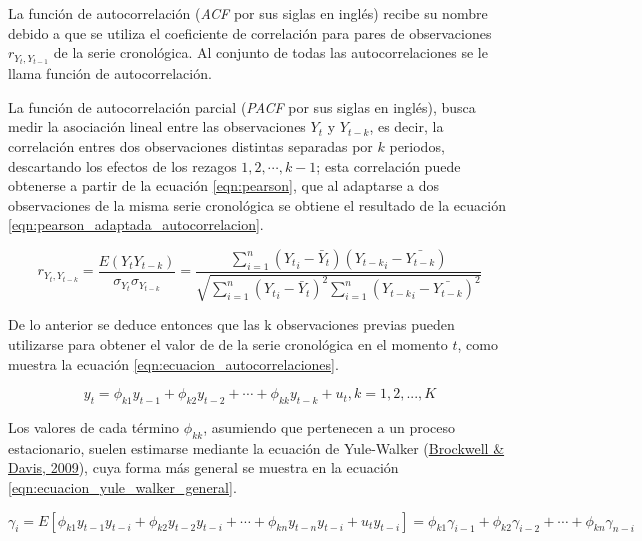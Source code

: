 \documentclass[
]{article}
\begin{document}
La función de autocorrelación (\emph{ACF} por sus siglas en inglés)
recibe su nombre debido a que se utiliza el coeficiente de correlación
para pares de observaciones \(r_{Y_t, Y_{t-1}}\) de la serie
cronológica. Al conjunto de todas las autocorrelaciones se le llama
función de autocorrelación.

La función de autocorrelación parcial (\emph{PACF} por sus siglas en
inglés), busca medir la asociación lineal entre las observaciones
\(Y_t\) y \(Y_{t-k}\), es decir, la correlación entres dos observaciones
distintas separadas por \(k\) periodos, descartando los efectos de los
rezagos \(1,2, \cdots ,k-1\); esta correlación puede obtenerse a partir
de la ecuación \ref{eqn:pearson}, que al adaptarse a dos observaciones
de la misma serie cronológica se obtiene el resultado de la ecuación
\ref{eqn:pearson_adaptada_autocorrelacion}.

\begin{equation}
\label{eqn:pearson_adaptada_autocorrelacion}
r_{{Y_t},{Y_{t-k}}}=\frac{E({Y_t}{Y_{t-k}})}{\sigma_{Y_t} \sigma_{Y_{t-k}}} = \frac{\sum_{i=1}^n \left({Y_t}_i- \bar{Y}_t \right) \left({Y_{t-k}}_i- \bar {Y_{t-k}}\right)}{\sqrt{\sum_{i=1}^n \left({Y_t}_i- \bar{Y}_t \right)^2 \sum_{i=1}^n \left({Y_{t-k}}_i- \bar {Y_{t-k}}\right)^2}}
\end{equation}

De lo anterior se deduce entonces que las k observaciones previas pueden
utilizarse para obtener el valor de de la serie cronológica en el
momento \(t\), como muestra la ecuación
\ref{eqn:ecuacion_autocorrelaciones}.

\begin{equation}
\label{eqn:ecuacion_autocorrelaciones}
y_t=\phi_{k1}y_{t-1}+\phi_{k2}y_{t-2}+\cdots+\phi_{kk}y_{t-k}+u_t,k=1,2,...,K
\end{equation}

Los valores de cada término \(\phi_{kk}\), asumiendo que pertenecen a un
proceso estacionario, suelen estimarse mediante la ecuación de
Yule-Walker (\protect\hyperlink{ref-yule.walker}{Brockwell \& Davis,
2009}), cuya forma más general se muestra en la ecuación
\ref{eqn:ecuacion_yule_walker_general}.

\begin{equation}
\label{eqn:ecuacion_yule_walker_general}
\gamma_i=E\left[ \phi_{k1}y_{t-1}y_{t-i} + \phi_{k2}y_{t-2}y_{t-i} + \cdots + \phi_{kn}y_{t-n}y_{t-i} + u_ty_{t-i} \right]=\phi_{k1}\gamma_{i-1} + \phi_{k2}\gamma_{i-2} + \cdots + \phi_{kn}\gamma_{n-i}
\end{equation}
\end{document}
